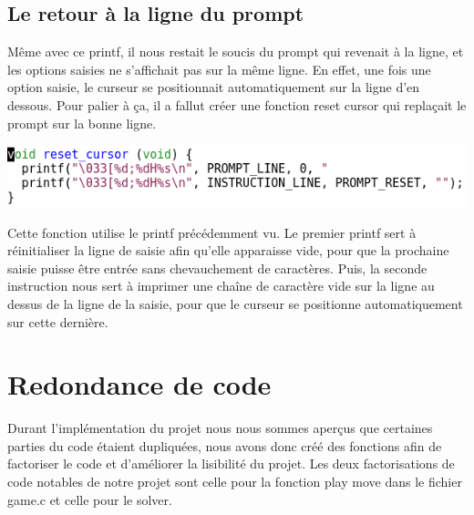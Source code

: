 \documentclass{article}
\begin{document}
\subsection {Le retour à la ligne du prompt}
Même avec ce printf, il nous restait le soucis du prompt qui revenait à la ligne, et les options saisies ne s'affichait pas sur la même ligne. En effet, une fois une option saisie, le curseur se positionnait automatiquement sur la ligne d'en dessous. Pour palier à ça, il a fallut créer une fonction reset cursor qui replaçait le prompt sur la bonne ligne.

\begin{flushleft}
\includegraphics[scale=0.45]{reset_cursor.png}
\end{flushleft}

Cette fonction utilise le printf précédemment vu. Le premier printf sert à réinitialiser la ligne de saisie afin qu'elle apparaisse vide, pour que la prochaine saisie puisse être entrée sans chevauchement de caractères. Puis, la seconde instruction nous sert à imprimer une chaîne de caractère vide sur la ligne au dessus de la ligne de la saisie, pour que le curseur se positionne automatiquement sur cette dernière.
\newpage
\section {Redondance de code}
Durant l'implémentation du projet nous nous sommes aperçus que certaines parties du code étaient dupliquées, nous avons donc créé des fonctions afin de factoriser le code et d'améliorer la lisibilité du projet. Les deux factorisations de code notables de notre projet sont celle pour la fonction play move dans le fichier game.c et celle pour le solver.
\end{document}
